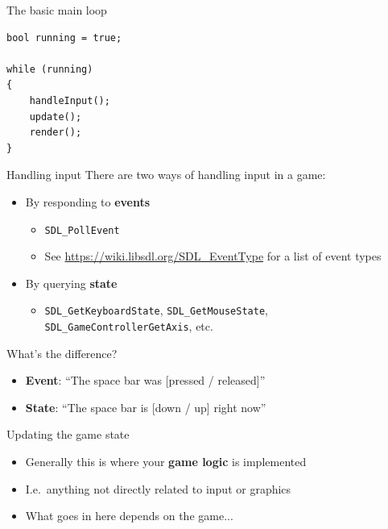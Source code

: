 \begin{frame}[fragile]{The basic main loop}
    \begin{lstlisting}
bool running = true;

while (running)
{
    handleInput();
    update();
    render();
}
    \end{lstlisting}
\end{frame}

\begin{frame}{Handling input}
    There are two ways of handling input in a game: \pause
    \begin{itemize}
        \item By responding to \textbf{events} \pause
            \begin{itemize}
                \item \lstinline{SDL_PollEvent} \pause
                \item See \url{https://wiki.libsdl.org/SDL_EventType} for a list of event types \pause
            \end{itemize}
        \item By querying \textbf{state} \pause
            \begin{itemize}
                \item \lstinline{SDL_GetKeyboardState}, \lstinline{SDL_GetMouseState},
                    \lstinline{SDL_GameControllerGetAxis}, etc. \pause
            \end{itemize}
    \end{itemize}
    What's the difference? \pause
    \begin{itemize}
        \item \textbf{Event}: ``The space bar was [pressed / released]'' \pause
        \item \textbf{State}: ``The space bar is [down / up] right now''
    \end{itemize}
\end{frame}

\begin{frame}{Updating the game state}
    \begin{itemize}
        \item Generally this is where your \textbf{game logic} is implemented \pause
        \item I.e.\ anything not directly related to input or graphics \pause
        \item What goes in here depends on the game...
    \end{itemize}
\end{frame}

